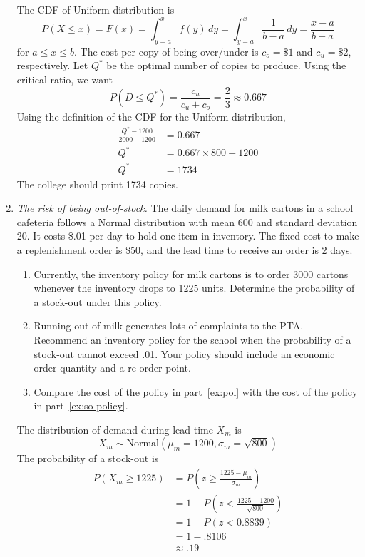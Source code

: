 \begin{enumerate}
\begin{solution}
\bs 
The CDF of Uniform distribution is
\[ P(X \leq x) = F(x) = \int_{y=a}^x f(y)\,dy = \int_{y=a}^x
  \frac{1}{b-a}\,dy = \frac{x-a}{b-a} \] for $a \leq x \leq b$.  The
cost per copy of being over/under is $c_o = \$1$ and $c_u = \$2$,
respectively.  Let $Q^{\ast}$ be the optimal number of copies to
produce.  Using the critical ratio, we want
\[ P\left(D \leq Q^{\ast}\right) = \frac{c_u}{c_u+c_o} = 
\frac{2}{3} \approx 0.667 \]
Using the definition of the CDF for the Uniform distribution,
\begin{align*}
  \frac{Q^{\ast} - 1200}{2000-1200} &= 0.667 \\
    Q^{\ast} &= 0.667\times 800 + 1200\\
    Q^{\ast} &= 1734
\end{align*}
The college should print 1734 copies.
\end{solution}

\item \emph{The risk of being out-of-stock.}
The daily demand for milk cartons in a school cafeteria
follows a Normal distribution with mean 600 and standard
deviation 20. It costs \$.01 per day to hold one item in
inventory. The fixed cost to make a replenishment order is
\$50, and the lead time to receive an order is 2 days.

\begin{enumerate}
\item Currently, the inventory policy for milk cartons is 
to order \num{3000} cartons whenever the inventory drops 
to \num{1225} units. Determine the probability of a 
stock-out under this policy. \label{ex:pol}

\item Running out of milk generates lots of complaints to the
PTA. Recommend an inventory policy for the school when
the probability of a stock-out cannot exceed .01.
Your policy should include an economic order quantity and 
a re-order point.
\label{ex:so-policy}

\item Compare the cost of the policy in part~\ref{ex:pol} with 
the cost of the policy in part~\ref{ex:so-policy}. \label{ex:comp-pol}
\end{enumerate}

\begin{solution}
\bs The distribution of demand during lead time $X_m$ is
\[ X_m \sim \text{Normal}(\mu_m=1200,\sigma_m=\sqrt{800}) \]
The probability of a stock-out is
\begin{align*}
  P(X_m \geq 1225) &= P\left(z \geq \frac{1225-\mu_m}{\sigma_m}\right) \\
                  &= 1 - P\left(z < \frac{1225-1200}{\sqrt{800}}\right) \\
                  &= 1 - P\left(z < 0.8839\right) \\
                  &= 1 - .8106 \\
                  &\approx .19
\end{align*}


\end{solution}
\end{enumerate}
